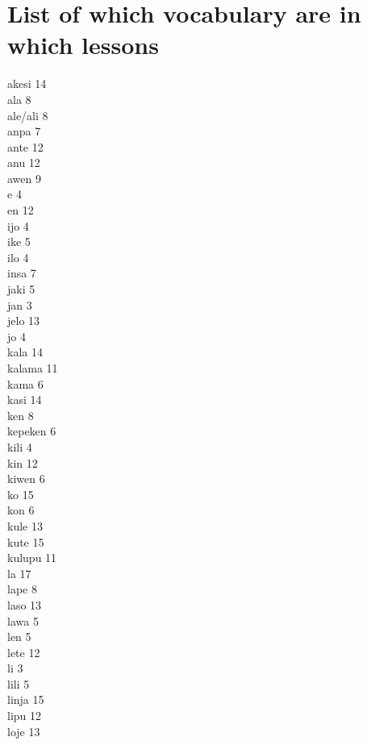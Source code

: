 \section{List of which vocabulary are in which lessons}

akesi 14 \\
ala 8 \\
ale/ali 8 \\
anpa 7 \\
ante 12 \\
anu 12 \\
awen 9 \\
e 4 \\
en 12 \\
ijo 4 \\
ike 5 \\
ilo 4 \\
insa 7 \\
jaki 5 \\
jan 3 \\
jelo 13 \\
jo 4 \\
kala 14 \\
kalama 11 \\
kama 6 \\
kasi 14 \\
ken 8 \\
kepeken 6 \\
kili 4 \\
kin 12 \\
kiwen 6 \\
ko 15 \\
kon 6 \\
kule 13 \\
kute 15 \\
kulupu 11 \\
la 17 \\
lape 8 \\
laso 13 \\
lawa 5 \\
len 5 \\
lete 12 \\
li 3 \\
lili 5 \\
linja 15 \\
lipu 12 \\
loje 13 \\
